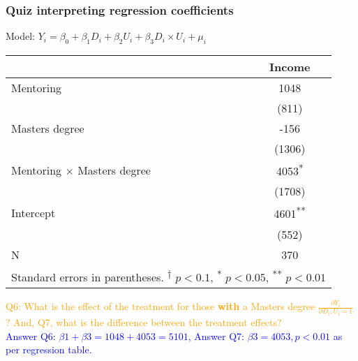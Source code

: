\documentclass[12pt,english,dvipsnames,aspectratio=169,handout]{beamer}\usepackage[]{graphicx}\usepackage[]{xcolor}
\begin{document}
\begin{frame}
	\frametitle{Quiz interpreting regression coefficients}
\centering
\tiny
Model: ${Y}_i = \beta_0 + \beta_1 D_i + \beta_2 U_i + \beta_3 D_i\times U_i + \mu_i$

\scriptsize
\begin{tabular}{l*{1}{c}}
\toprule
          &\multicolumn{1}{c}{Income}\\
\midrule
Mentoring     &     1048        \\
          &    (811)        \\
Masters degree    &     -156        \\
          &   (1306)        \\
Mentoring $\times$ Masters degree &     4053\textsuperscript{*} \\
          &   (1708)        \\
Intercept    &     4601\textsuperscript{**}\\
          &    (552)        \\
\midrule
N         &      370        \\
\bottomrule
\multicolumn{2}{l}{Standard errors in parentheses. \textsuperscript{†} \(p<0.1\), \textsuperscript{*} \(p<0.05\), \textsuperscript{**} \(p<0.01\)}\\
\end{tabular}
\scriptsize\flushleft

\textcolor{orange}{Q6: What is the effect of the treatment for those \textbf{with} a Masters degree $\frac{\partial Y_i}{\partial D_i, U_i=1}$? And, Q7, what is the difference between the treatment effects?}\\
\textcolor{blue}{Answer Q6: $\beta1 + \beta3 = 1048 + 4053 =5101$, Answer Q7: $\beta3 = 4053, p<0.01$ as per regression table.}

\end{frame}
\end{document}
